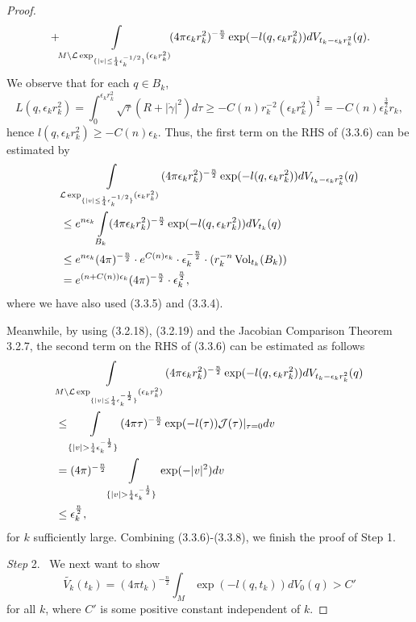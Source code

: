 \begin{proof}
\begin{align}
&\quad +\!\int\limits_{M\setminus{\mathcal{L}}
\exp_{\{|v|\leq\frac{1}{4}\epsilon_k^{-1/2}\}}(\epsilon_kr_k^2)}\!\!
(4\pi\epsilon_kr_k^2)^{-\frac{n}{2}}
\exp(-l(q,\epsilon_kr_k^2))dV_{t_k-\epsilon_kr_k^2}(q).\nonumber
\end{align}   %
We observe that for each $q\in B_k$,
$$
L(q,\epsilon_kr^2_k)
=\int_0^{\epsilon_kr_k^2}\sqrt{\tau}(R+|\dot{\gamma}|^2)d\tau
\geq-C(n)r_k^{-2}(\epsilon_kr_k^2)^{\frac{3}{2}}
=-C(n)\epsilon_k^{\frac{3}{2}}r_k,
$$
hence $l(q,\epsilon_kr^2_k)\geq -C(n)\epsilon_k.$ Thus, the first
term on the RHS of (3.3.6) can be estimated by
\begin{align}
&\int\limits_{\mathcal{L}\exp_{\{|v|\leq\frac{1}{4}
\epsilon_k^{-1/2}\}}(\epsilon_kr^2_k)}
(4\pi\epsilon_kr^2_k)^{-\frac{n}{2}}
\exp(-l(q,\epsilon_kr_k^2))dV_{t_k-\epsilon_kr^2_k}(q)\\
&\leq e^{n\epsilon_k}\int\limits_{B_k}
(4\pi\epsilon_kr^2_k)^{-\frac{n}{2}}
\exp(-l(q,\epsilon_kr_k^2))dV_{t_k}(q)\nonumber\\
&\leq e^{n\epsilon_k}(4\pi)^{-\frac{n}{2}}\cdot
e^{C(n)\epsilon_k}\cdot
\epsilon_k^{-\frac{n}{2}}\cdot(r_k^{-n}\operatorname{Vol}_{t_k}(B_k))\nonumber\\
&=e^{(n+C(n))\epsilon_k}(4\pi)^{-\frac{n}{2}}
\cdot\epsilon_k^\frac{n}{2},\nonumber
\end{align}  %
where we have also used (3.3.5) and (3.3.4).

Meanwhile, by using (3.2.18), (3.2.19) and the Jacobian Comparison
Theorem 3.2.7, the second term on the RHS of (3.3.6) can be
estimated as follows
\begin{align}
&\int\limits_{M\setminus\mathcal{L}\exp_{\{|v|\leq\frac{1}{4}
\epsilon_k^{-\frac{1}{2}}\}}(\epsilon_kr^2_k)}
(4\pi\epsilon_kr^2_k)^{-\frac{n}{2}}
\exp(-l(q,\epsilon_kr_k^2))dV_{t_k-\epsilon_kr^2_k}(q)\\
&\leq \int\limits_{\{|v|>\frac{1}{4}\epsilon_k^{-\frac{1}{2}}\}}
(4\pi\tau)^{-\frac{n}{2}}
\exp(-l(\tau))\mathcal{J}(\tau)|_{\tau=0}dv \nn\\
&=(4\pi)^{-\frac{n}{2}}\int\limits_{\{|v|>\frac{1}{4}
\epsilon_k^{-\frac{1}{2}}\}}\exp(-|v|^2)dv \nn\\
&\leq \epsilon_k^{\frac{n}{2}},\nn
\end{align} %
for $k$ sufficiently large. Combining (3.3.6)-(3.3.8), we finish
the proof of Step 1.

\medskip
{\it Step} 2. \ We next want to show
$$
\tilde{V_k}(t_k)=(4\pi
t_k)^{-\frac{n}{2}}\int_M\exp(-l(q,t_k))dV_0(q)>C'
$$
for all $k$, where $C'$ is some positive constant independent of
$k$.


\end{proof}
